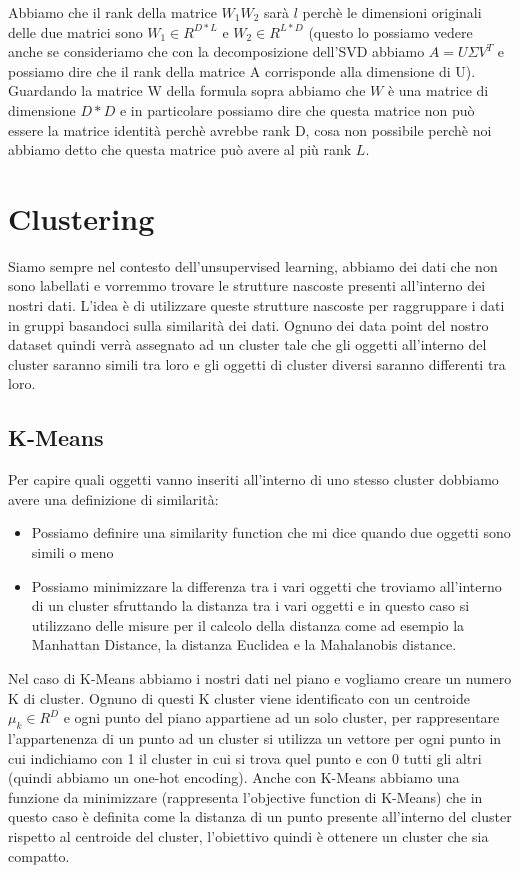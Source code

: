 \documentclass[14pt]{extreport}
\begin{document}
Abbiamo che il rank della matrice $W_1W_2$ sarà $l$ perchè le dimensioni originali delle due matrici sono $W_1 \in R^{D*L}$ e $W_2 \in R^{L*D}$
(questo lo possiamo vedere anche se consideriamo che con la decomposizione dell'SVD abbiamo $A = U \Sigma V^{T}$ e possiamo dire che il rank della
matrice A corrisponde alla dimensione di U). Guardando la matrice W della formula sopra abbiamo che $W$ è una matrice di dimensione $D*D$ e in
particolare possiamo dire che questa matrice non può essere la matrice identità perchè avrebbe rank D, cosa non possibile perchè noi abbiamo detto che
questa matrice può avere al più rank $L$.

\chapter{Clustering}

Siamo sempre nel contesto dell'unsupervised learning, abbiamo dei dati che non sono labellati e vorremmo trovare le strutture nascoste presenti
all'interno dei nostri dati. L'idea è di utilizzare queste strutture nascoste per raggruppare i dati in gruppi basandoci sulla similarità dei dati.
Ognuno dei data point del nostro dataset quindi verrà assegnato ad un cluster tale che gli oggetti all'interno del cluster saranno simili tra loro e
gli oggetti di cluster diversi saranno differenti tra loro.

\section{K-Means}

Per capire quali oggetti vanno inseriti all'interno di uno stesso cluster dobbiamo avere una definizione di similarità:
\begin{itemize}
	\item Possiamo definire una similarity function che mi dice quando due oggetti sono simili o meno
	\item Possiamo minimizzare la differenza tra i vari oggetti che troviamo all'interno di un cluster sfruttando la distanza tra i vari oggetti e in
	      questo caso si utilizzano delle misure per il calcolo della distanza come ad esempio la Manhattan Distance, la distanza Euclidea e la
	      Mahalanobis distance.
\end{itemize}

Nel caso di K-Means abbiamo i nostri dati nel piano e vogliamo creare un numero K di cluster. Ognuno di questi K cluster viene identificato con un
centroide $\mu_k \in R^D$ e ogni punto del piano appartiene ad un solo cluster, per rappresentare l'appartenenza di un punto ad un cluster si utilizza
un vettore per ogni punto in cui indichiamo con 1 il cluster in cui si trova quel punto e con 0 tutti gli altri (quindi abbiamo un one-hot encoding).
Anche con K-Means abbiamo una funzione da minimizzare (rappresenta l'objective function di K-Means) che in questo caso è definita come la distanza di
un punto presente all'interno del cluster rispetto al centroide del cluster, l'obiettivo quindi è ottenere un cluster che sia compatto.
\end{document}
